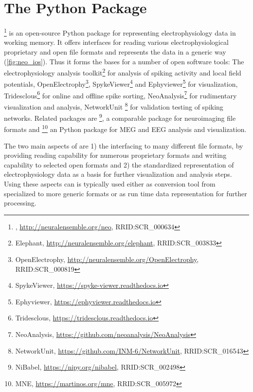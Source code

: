 




\section{The  Python Package}
\footnote{, \url{http://neuralensemble.org/neo}, RRID:SCR\_000634} \citep{Garcia_2014} is an open-source Python package for representing electrophysiology data in working memory. It offers interfaces for reading various electrophysiological proprietary and open file formats and represents the data in a generic way (\cref{fig:neo_ios}). Thus it forms the bases for a number of open software tools: The electrophysiology analysis toolkit\footnote{Elephant, \url{http://neuralensemble.org/elephant}, RRID:SCR\_003833} for analysis of spiking activity and local field potentials, OpenElectrophy\footnote{OpenElectrophy, \url{http://neuralensemble.org/OpenElectrophy}, RRID:SCR\_000819}, SpykeViewer\footnote{SpykeViewer, \url{https://spyke-viewer.readthedocs.io}} and Ephyviewer\footnote{Ephyviewer, \url{https://ephyviewer.readthedocs.io}} for visualization, Tridesclous\footnote{Tridesclous, \url{https://tridesclous.readthedocs.io}} for online and offline spike sorting, NeoAnalysis\footnote{NeoAnalysis, \url{https://github.com/neoanalysis/NeoAnalysis}} \citep{Zhang_2017} for rudimentary visualization and analysis, NetworkUnit \footnote{NetworkUnit, \url{https://github.com/INM-6/NetworkUnit}, RRID:SCR\_016543} for validation testing of spiking networks. Related packages are \footnote{NiBabel, \url{https://nipy.org/nibabel}, RRID:SCR\_002498}, a comparable package for neuroimaging file formats and \footnote{MNE, \url{https://martinos.org/mne}, RRID:SCR\_005972} an Python package for MEG and EEG analysis and visualization.

The two main aspects of  are 1) the interfacing to many different file formats, by providing reading capability for numerous proprietary formats and writing capability to selected open formats and 2) the standardized representation of electrophysiology data as a basis for further visualization and analysis steps. Using these aspects  can is typically used either as conversion tool from specialized to more generic formats or as run time data representation for further processing.

